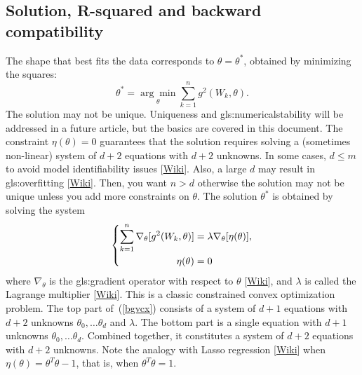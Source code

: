\documentclass[oneside,10pt]{book}
\begin{document}
\subsection{Solution, R-squared and backward compatibility}

The shape that best fits the data corresponds to $\theta=\theta^*$, obtained by minimizing the squares:
\begin{equation}
\theta^* = \underset{\theta}{\arg\min} \sum_{k=1}^n g^2(W_k,\theta).\label{tyrefd}
\end{equation}
The solution may not be unique. Uniqueness and \gls{gls:numericalstability} will be addressed in a future article, but the basics are covered in this document. The constraint $\eta(\theta)=0$ guarantees that the solution requires solving a (sometimes non-linear)
 system of $d+2$ equations with $d+2$  unknowns. In some cases, $d\leq m$ to avoid \textcolor{index}{model identifiability} issues
 [\href{https://en.wikipedia.org/wiki/Identifiability}{Wiki}]. Also, a large $d$ may result in \gls{gls:overfitting}
 [\href{https://en.wikipedia.org/wiki/Overfitting}{Wiki}].  Then, you want $n > d$ otherwise the solution may  not be unique unless you add more
 constraints on $\theta$. The solution $\theta^*$ is obtained by solving the system
\begin{equation}
\centering
\left\{\begin{split}
 \sum_{k=1}^n \nabla_\theta [g^2(W_k,\theta)] & =\lambda \nabla_\theta [\eta(\theta)],\\
 \eta(\theta) & =0 \\
\end{split}\right. \label{bgvcx}
\end{equation}
where $\nabla_\theta$ is the \gls{gls:gradient} operator with respect to $\theta$ [\href{https://en.wikipedia.org/wiki/Gradient}{Wiki}], and $\lambda$ is called the \textcolor{index}{Lagrange multiplier} [\href{https://en.wikipedia.org/wiki/Lagrange_multiplier}{Wiki}]. This is a classic constrained convex optimization problem. The top part of~(\ref{bgvcx}) consists of a system of $d+1$ equations with $d+2$ unknowns
  $\theta_0,\dots\theta_d$ and $\lambda$. The bottom part is a single equation with $d+1$ unknowns  $\theta_0,\dots\theta_d$. Combined together,
 it constitutes a system of $d+2$ equations with $d+2$ unknowns. Note the analogy with \textcolor{index}{Lasso regression}
 [\href{https://en.wikipedia.org/wiki/Lasso_(statistics)}{Wiki}] when $\eta(\theta)=\theta^T\theta - 1$, that is, when $\theta^T\theta=1$.
\end{document}

